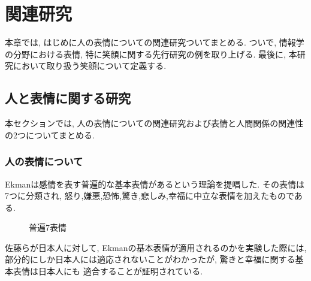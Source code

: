 \chapter{関連研究}
\label{chap:smile}

本章では, はじめに人の表情についての関連研究ついてまとめる.
ついで, 情報学の分野における表情, 特に笑顔に関する先行研究の例を取り上げる.
最後に, 本研究において取り扱う笑顔について定義する.

\section{人と表情に関する研究}
本セクションでは, 人の表情についての関連研究および表情と人間関係の関連性の2つについてまとめる.
\subsection{人の表情について}
Ekmanは感情を表す普遍的な基本表情があるという理論を提唱した.
その表情は7つに分類され, 怒り,嫌悪,恐怖,驚き,悲しみ,幸福に中立な表情を加えたものである.\cite{ekman}
\begin{figure}[htbp]
    \begin{center}
    \end{center}
    \caption{普遍7表情}
    \label{fig:universal_facial_expression}
\end{figure}
佐藤らが日本人に対して, Ekmanの基本表情が適用されるのかを実験した際には,
部分的にしか日本人には適応されないことがわかったが, 驚きと幸福に関する基本表情は日本人にも
適合することが証明されている.\cite{JapaneseFacialExpression}
